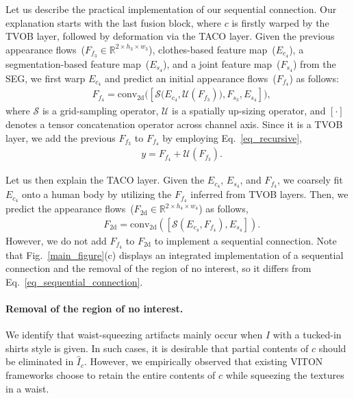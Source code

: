 \documentclass[letterpaper]{article} %
\begin{document}
Let us describe the practical implementation of our sequential connection.
Our explanation starts with the last fusion block, where $c$ is firstly warped by the TVOB layer, followed by deformation via the TACO layer.
Given the previous appearance flows~($F_{f_{3}} \in \mathbb{R}^{2\times h_{3} \times w_{3}}$), clothes-based feature map~($E_{{c}_{4}}$), a segmentation-based feature map~($E_{{s}_{4}}$), and a joint feature map~($F_{{s}_{4}}$) from the SEG, we first warp $E_{{c}_{4}}$ and predict an initial appearance flows~($F_{f_{4}}$) as follows:
\begin{eqnarray}
    & F_{f_{4}} = \text{conv}_{\text{2d}}\big( [\mathcal{S}\big(E_{{c}_{4}}, \mathcal{U}(F_{f_{3}})\big), F_{{s}_{3}}, E_{{s}_{4}}] \big),
\end{eqnarray}
where $\mathcal{S}$ is a grid-sampling operator, $\mathcal{U}$ is a spatially up-sizing operator, and $[\cdot]$ denotes a tensor concatenation operator across channel axis.
Since it is a TVOB layer, we add the previous $F_{f_{3}}$ to $F_{f_{4}}$ by employing Eq.~\ref{eq_recursive},
\begin{eqnarray}
    & y = F_{f_{4}} + \mathcal{U}(F_{f_{3}}). \nonumber
    \label{eq_initial_warping}
\end{eqnarray}

Let us then explain the TACO layer.
Given the $E_{{c}_{4}}$, $E_{{s}_{4}}$, and $F_{f_{4}}$, we coarsely fit $E_{{c}_{4}}$ onto a human body by utilizing the $F_{f_{4}}$ inferred from TVOB layers. Then, we predict the appearance flows~($F_{\text{2d}} \in \mathbb{R}^{2 \times h_4 \times w_4}$) as follows,
\begin{eqnarray}
    & F_{\text{2d}} = \text{conv}_{\text{2d}}([\mathcal{S}(E_{{c}_{4}}, F_{f_{4}}), E_{{s}_{4}}]).
    \label{eq_sequential_connection}
\end{eqnarray}
However, we do not add $F_{f_{4}}$ to $F_{\text{2d}}$ to implement a sequential connection.
Note that Fig.~\ref{main_figure}(c) displays an integrated implementation of a sequential connection and the removal of the region of no interest, so it differs from Eq.~\ref{eq_sequential_connection}. 

\paragraph{Removal of the region of no interest.} 
We identify that waist-squeezing artifacts mainly occur when $I$ with a tucked-in shirts style is given.
In such cases, it is desirable that partial contents of $c$ should be eliminated in $\hat{I}_c$.
However, we empirically observed that existing VITON frameworks choose to retain the entire contents of $c$ while squeezing the textures in a waist.
\end{document}
